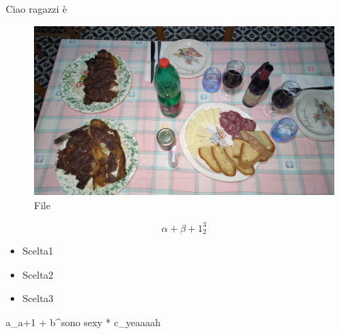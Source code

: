 \documentclass{article}
\begin{document}
Ciao ragazzi \`{e}
\begin{figure}
    \centering
    \includegraphics[width=0.5\linewidth]{Images/IMG20221231200758.jpg}
    \caption{File}
\end{figure}
\begin{equation}
\alpha + \beta + 1_2^3
\end{equation}
\begin{itemize}
\item{Scelta1}
\item{Scelta2}
\item{Scelta3}
\end{itemize}
\sum a_{a+1} + b^{sono sexy} * c_{yeaaaah}
\end{document}
